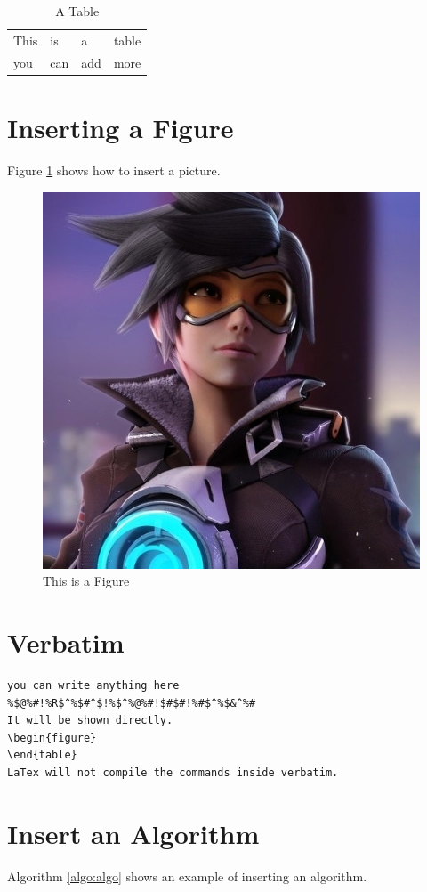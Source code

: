 \documentclass{article}[12pt]
\begin{document}
\begin{table}
  \centering
  \begin{tabular}{|l|l|l|l|}
    \hline
    This & is &a&table\\
    you  & can & add & more \\
    \hline
  \end{tabular}
  \caption{A Table}\label{tab:table}
\end{table}

\section{Inserting a Figure}

Figure \ref{fig:figure} shows how to insert a picture.

\begin{figure}
  \centering
  \includegraphics[width=0.3\columnwidth]{temp.jpg}
  \caption{This is a Figure}\label{fig:figure}
\end{figure}

\section{Verbatim}

\begin{verbatim}
you can write anything here
%$@%#!%R$^%$#^$!%$^%@%#!$#$#!%#$^%$&^%#
It will be shown directly.
\begin{figure}
\end{table}
LaTex will not compile the commands inside verbatim.
\end{verbatim}

\section{Insert an Algorithm}

Algorithm \ref{algo:algo} shows an example of inserting an algorithm.
\end{document}

